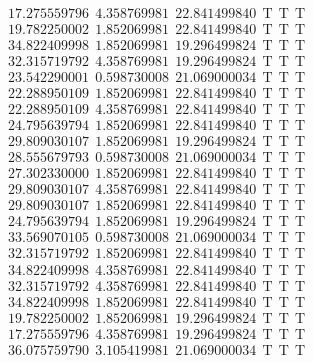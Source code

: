 \documentclass[10pt,a4paper]{article}
\begin{document}
\begin{itemize}
\begin{displaymath}
{\begin{aligned}
&17.275559796 ~~   4.358769981 ~~  22.841499840  ~~\mathrm{T  ~~ T  ~~ T } \\ 
&19.782250002 ~~   1.852069981 ~~  22.841499840  ~~\mathrm{T  ~~ T  ~~ T } \\ 
&34.822409998 ~~   1.852069981 ~~  19.296499824  ~~\mathrm{T  ~~ T  ~~ T } \\ 
&32.315719792 ~~   4.358769981 ~~  19.296499824  ~~\mathrm{T  ~~ T  ~~ T } \\ 
&23.542290001 ~~   0.598730008 ~~  21.069000034  ~~\mathrm{T  ~~ T  ~~ T } \\ 
&22.288950109 ~~   1.852069981 ~~  22.841499840  ~~\mathrm{T  ~~ T  ~~ T } \\ 
&22.288950109 ~~   4.358769981 ~~  22.841499840  ~~\mathrm{T  ~~ T  ~~ T } \\ 
&24.795639794 ~~   1.852069981 ~~  22.841499840  ~~\mathrm{T  ~~ T  ~~ T } \\ 
&29.809030107 ~~   1.852069981 ~~  19.296499824  ~~\mathrm{T  ~~ T  ~~ T } \\ 
&28.555679793 ~~   0.598730008 ~~  21.069000034  ~~\mathrm{T  ~~ T  ~~ T } \\ 
&27.302330000 ~~   1.852069981 ~~  22.841499840  ~~\mathrm{T  ~~ T  ~~ T } \\ 
&29.809030107 ~~   4.358769981 ~~  22.841499840  ~~\mathrm{T  ~~ T  ~~ T } \\ 
&29.809030107 ~~   1.852069981 ~~  22.841499840  ~~\mathrm{T  ~~ T  ~~ T } \\ 
&24.795639794 ~~   1.852069981 ~~  19.296499824  ~~\mathrm{T  ~~ T  ~~ T } \\ 
&33.569070105 ~~   0.598730008 ~~  21.069000034  ~~\mathrm{T  ~~ T  ~~ T } \\ 
&32.315719792 ~~   1.852069981 ~~  22.841499840  ~~\mathrm{T  ~~ T  ~~ T } \\ 
&34.822409998 ~~   4.358769981 ~~  22.841499840  ~~\mathrm{T  ~~ T  ~~ T } \\ 
&32.315719792 ~~   4.358769981 ~~  22.841499840  ~~\mathrm{T  ~~ T  ~~ T } \\ 
&34.822409998 ~~   1.852069981 ~~  22.841499840  ~~\mathrm{T  ~~ T  ~~ T } \\ 
&19.782250002 ~~   1.852069981 ~~  19.296499824  ~~\mathrm{T  ~~ T  ~~ T } \\ 
&17.275559796 ~~   4.358769981 ~~  19.296499824  ~~\mathrm{T  ~~ T  ~~ T } \\ 
&36.075759790 ~~   3.105419981 ~~  21.069000034  ~~\mathrm{T  ~~ T  ~~ T } \\ 

\end{aligned}}
\end{displaymath}
\end{itemize}
\end{document}
